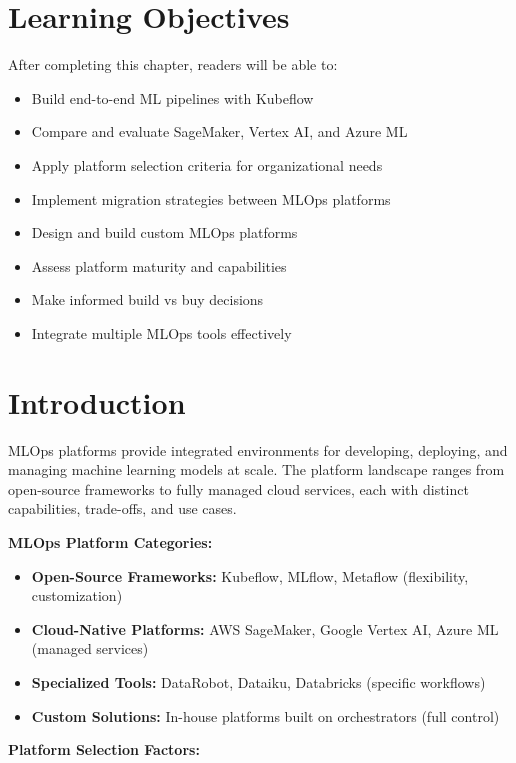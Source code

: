 \section{Learning Objectives}

After completing this chapter, readers will be able to:
\begin{itemize}
    \item Build end-to-end ML pipelines with Kubeflow
    \item Compare and evaluate SageMaker, Vertex AI, and Azure ML
    \item Apply platform selection criteria for organizational needs
    \item Implement migration strategies between MLOps platforms
    \item Design and build custom MLOps platforms
    \item Assess platform maturity and capabilities
    \item Make informed build vs buy decisions
    \item Integrate multiple MLOps tools effectively
\end{itemize}

\section{Introduction}

MLOps platforms provide integrated environments for developing, deploying, and managing machine learning models at scale. The platform landscape ranges from open-source frameworks to fully managed cloud services, each with distinct capabilities, trade-offs, and use cases.

\textbf{MLOps Platform Categories:}

\begin{itemize}
    \item \textbf{Open-Source Frameworks:} Kubeflow, MLflow, Metaflow (flexibility, customization)
    \item \textbf{Cloud-Native Platforms:} AWS SageMaker, Google Vertex AI, Azure ML (managed services)
    \item \textbf{Specialized Tools:} DataRobot, Dataiku, Databricks (specific workflows)
    \item \textbf{Custom Solutions:} In-house platforms built on orchestrators (full control)
\end{itemize}

\textbf{Platform Selection Factors:}

